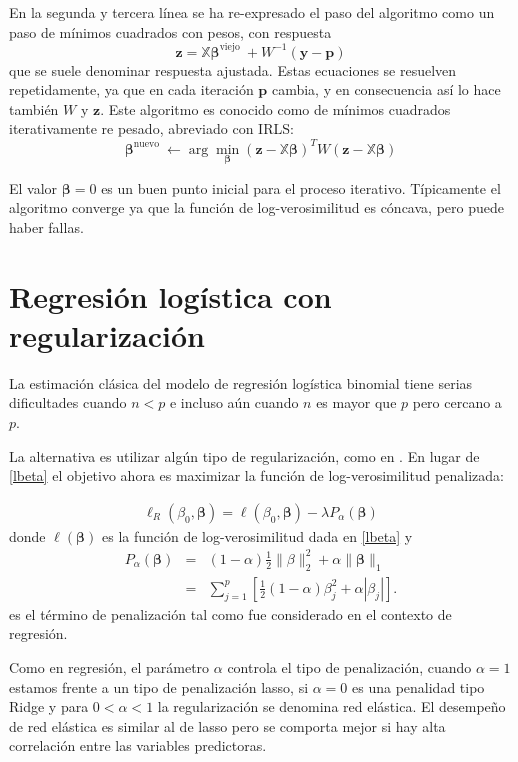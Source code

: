 \documentclass{report}
\begin{document}
 En la segunda y tercera línea se ha re-expresado el paso del algoritmo como un paso de mínimos cuadrados con pesos, con respuesta 
$$
\mathbf{z}=\mathbb{X} \boldsymbol{\beta}^{\text {viejo }}+W^{-1}(\mathbf{y}-\mathbf{p})
$$
que se suele denominar  respuesta ajustada. Estas ecuaciones se resuelven repetidamente, ya que en cada iteración $\mathbf{p}$ cambia, y en consecuencia así lo hace también $W$ y  $\mathbf{z}$. Este algoritmo es conocido como de mínimos cuadrados iterativamente re pesado, abreviado con IRLS:
$$
\boldsymbol{\beta}^{\text {nuevo }} \leftarrow \arg \min _{\boldsymbol{\beta}}(\mathbf{z}-\mathbb{X} \boldsymbol{\beta})^T W(\mathbf{z}-\mathbb{X} \boldsymbol{\beta})
$$
 
 
 El valor $\boldsymbol{\beta}=0$ es un buen punto inicial para el proceso iterativo. Típicamente el algoritmo converge ya que la función de log-verosimilitud es cóncava, pero puede haber fallas. 


\chapter{Regresión logística con regularización }\label{capreglogreg}




 La estimación clásica del modelo de regresión logística binomial tiene serias dificultades cuando $n<p$ e incluso aún cuando $n$ es mayor que $p$ pero cercano a $p$. 
 
 
 La alternativa es utilizar algún tipo de regularización, como en \cite{friedman2010}.   En lugar de \eqref{lbeta} el objetivo ahora es maximizar la función de log-verosimilitud penalizada: 
 
 \begin{eqnarray}\label{lbetaref} 
\ell_R(\beta_0, \boldsymbol{\beta})   =	\ell(\beta_0, \boldsymbol{\beta})  -\lambda P_{\alpha}(\boldsymbol{\beta})
 \end{eqnarray}
donde $	\ell(\boldsymbol{\beta}) $ es la función de log-verosimilitud dada en \eqref{lbeta} y
\begin{eqnarray}\label{penal1}  
	P_\alpha(\boldsymbol{\beta}) &=&(1-\alpha) \frac{1}{2}\|\beta\|_{2}^2+\alpha\|\boldsymbol{\beta}\|_{1} \\
	&=&\sum_{j=1}^p\left[\frac{1}{2}(1-\alpha) \beta_j^2+\alpha\left|\beta_j\right|\right] .
\end{eqnarray}
es el término de penalización tal como fue considerado en el contexto de regresión. 


Como en regresión, el parámetro $\alpha$ controla el tipo de penalización, cuando $\alpha=1$ estamos frente a un tipo de penalización lasso, si $\alpha=0$ es una penalidad tipo  Ridge y para $0<\alpha<1$ la regularización se denomina red elástica. El desempeño de red elástica es similar al de lasso pero se comporta mejor si hay alta correlación entre las variables predictoras.
\end{document}

